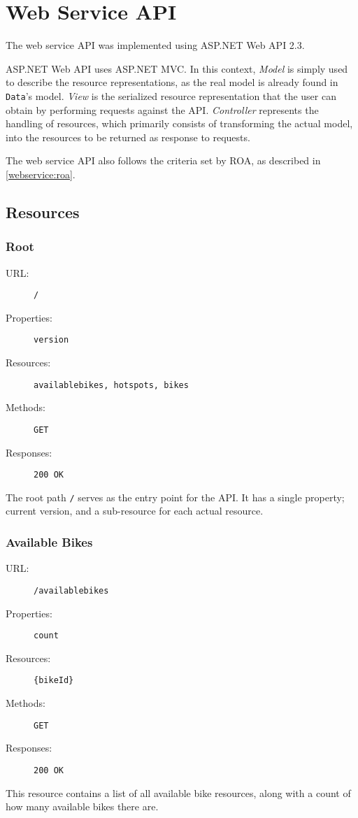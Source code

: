 \section{Web Service API}
The web service API was implemented using ASP.NET Web API 2.3.\cite{aspnet_webapi}

ASP.NET Web API uses ASP.NET MVC.
In this context, \textit{Model} is simply used to describe the resource representations, as the real model is already found in \texttt{Data}'s model.
\textit{View} is the serialized resource representation that the user can obtain by performing requests against the API.
\textit{Controller} represents the handling of resources, which primarily consists of transforming the actual model, into the resources to be returned as response to requests.

The web service API also follows the criteria set by ROA, as described in \cref{webservice:roa}.

\subsection{Resources}

\newcommand{\resource}[5]{\begin{description}
\item[URL:]{\texttt{#1}}
\item[Properties:]{\texttt{#2}}
\item[Resources:]{\texttt{#3}}
\item[Methods:]{\texttt{#4}}
\item[Responses:]{\texttt{#5}}
\end{description}}

\subsubsection{Root}
\resource{/}{version}{availablebikes, hotspots, bikes}{GET}{200 OK}
The root path \texttt{/} serves as the entry point for the API.
It has a single property; current version, and a sub-resource for each actual resource.

\subsubsection{Available Bikes}
\resource{/availablebikes}{count}{\{bikeId\}}{GET}{200 OK}
This resource contains a list of all available bike resources, along with a count of how many available bikes there are.


